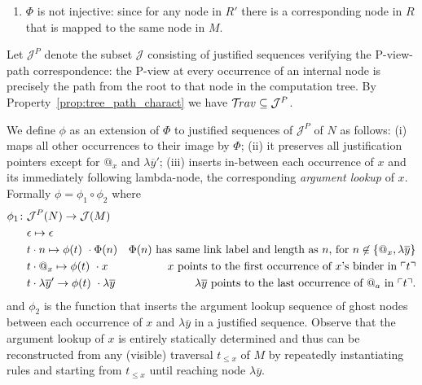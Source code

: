\documentclass{article}
\theoremstyle{plain}
\theoremstyle{definition}
\theoremstyle{remark}
\def\justseqset{\mathcal{J}}
\begin{document}
\begin{description}[itemindent=0em,leftmargin=0cm]
\begin{enumerate}[label=(\roman*)]
    \item $\Phi$ is not injective: since for any node in $R'$ there is a corresponding node in $R$ that is mapped to the same node in $M$.
\end{enumerate}

Let $\justseqset^P$ denote the subset $\justseqset$
consisting of justified sequences verifying the P-view-path correspondence:
the P-view at every occurrence of an internal node is precisely the path from the root to that node in the computation tree. By Property~\ref{prop:tree_path_charact} we have $\travset \subseteq \justseqset^P$.

We define $\phi$ as an extension of $\Phi$ to justified sequences of $\justseqset^P$ of $N$ as follows:
(i) maps all other occurrences to their image by $\Phi$;
(ii) it preserves all justification pointers except for $@_x$ and $\lambda\overline{y}'$;
(iii) inserts in-between each occurrence of $x$ and its immediately following lambda-node, the corresponding \emph{argument lookup} of $x$. Formally $\phi = \phi_1 \circ \phi_2$ where
\begin{align*}
\phi_1 \colon & \justseqset^P(N) \rightarrow \justseqset(M) \\
& \epsilon \mapsto \epsilon  \\
& t \cdot n \mapsto \phi(t) \ \cdot \Phi(n) &\mbox{$\Phi(n)$ has same link label and length as $n$, for $n\not\in \{ @_x, \lambda\overline{y} \}$}\\
 & t \cdot @_x \mapsto \phi(t) \ \cdot x &\mbox{$x$ points to the first occurrence of $x$'s binder in $\pview{t}$} \\
& t \cdot \lambda\overline{y}' \rightarrow \phi(t) \ \cdot \lambda\overline{y} &\mbox{$\lambda\overline{y}$ points to the last occurrence of $@_a$ in $\pview{t}$.}
\end{align*}
and $\phi_2$ is the function that inserts the argument lookup sequence of ghost nodes between each occurrence of $x$ and $\lambda\overline{y}$ in a justified sequence. Observe that the argument lookup of $x$ is entirely statically determined and thus can be reconstructed from any (visible) traversal $t_{\leq x}$ of $M$ by repeatedly instantiating rules  and  starting from $t_{\leq x}$ until reaching node $\lambda\overline{y}$.


\end{description}
\end{document}
